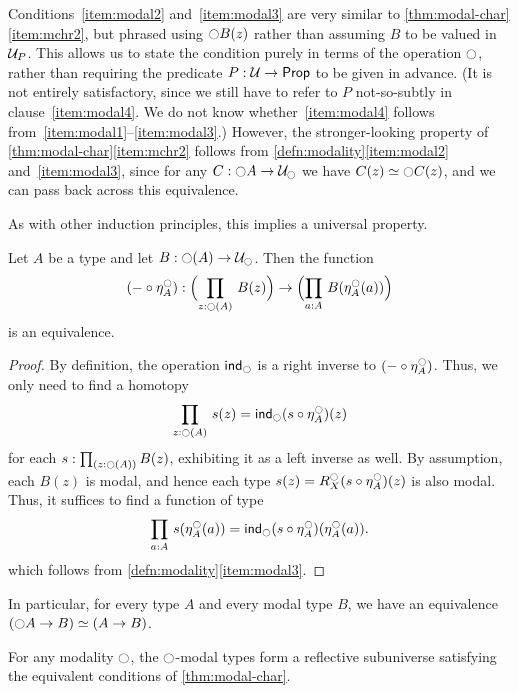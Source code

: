 Conditions~\ref{item:modal2} and~\ref{item:modal3} are very similar to \autoref{thm:modal-char}\ref{item:mchr2}, but phrased using $\modal B(z)$ rather than assuming $B$ to be valued in $\P$.
This allows us to state the condition purely in terms of the operation $\modal$, rather than requiring the predicate $P:\type\to\prop$ to be given in advance.
(It is not entirely satisfactory, since we still have to refer to $P$ not-so-subtly in clause~\ref{item:modal4}.
We do not know whether~\ref{item:modal4} follows from~\ref{item:modal1}--\ref{item:modal3}.)
However, the stronger-looking property of \autoref{thm:modal-char}\ref{item:mchr2} follows from \autoref{defn:modality}\ref{item:modal2} and~\ref{item:modal3}, since for any $C:\modal A \to \modaltype$ we have $C(z) \eqvsym \modal C(z)$, and we can pass back across this equivalence.

As with other induction principles, this implies a universal property.

\begin{thm}\label{prop:lv_n_deptype_sec_equiv_by_precomp}
Let $A$ be a type and let $B:\modal(A)\to\modaltype$. Then the function
\begin{equation*}
(-\circ \mreturn^\modal_A) : \Parens{\prd{z:\modal(A)}B(z)} \to \Parens{\prd{a:A}B(\mreturn^\modal_A(a))}
\end{equation*}
is an equivalence.
\end{thm}
\begin{proof}
By definition, the operation $\ind{\modal}$ is a right inverse to $(-\circ \mreturn^\modal_A)$.
Thus, we only need to find a homotopy
\begin{equation*}
\prd{z:\modal(A)}s(z)= \ind{\modal}(s\circ \mreturn^\modal_A)(z)
\end{equation*}
for each $s:\prd{z:\modal(A)}B(z)$, exhibiting it as a left inverse as well.
By assumption, each $B(z)$ is modal, and hence each type $s(z)= R^\modal_X(s\circ \mreturn^\modal_A)(z)$
is also modal.
Thus, it suffices to find a function of type
\begin{equation*}
\prd{a:A}s(\mreturn^\modal_A(a))= \ind{\modal}(s\circ \mreturn^\modal_A)(\mreturn^\modal_A(a)).
\end{equation*}
which follows from \autoref{defn:modality}\ref{item:modal3}.
\end{proof}

In particular, for every type $A$ and every modal type $B$, we have an equivalence $(\modal A\to B)\eqvsym (A\to B)$.

\begin{cor}
  For any modality $\modal$, the $\modal$-modal types form a reflective subuniverse satisfying the equivalent conditions of \autoref{thm:modal-char}.
\end{cor}

